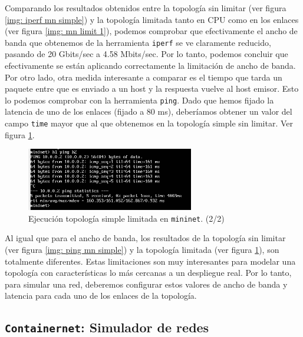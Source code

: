 \documentclass[12pt]{article}
\begin{document}
	\noindent Comparando los resultados obtenidos entre la topología sin limitar (ver figura \ref{img: iperf mn simple}) y la topología limitada tanto en CPU como en los enlaces (ver figura \ref{img: mn limit 1}), podemos comprobar que efectivamente el ancho de banda que obtenemos de la herramienta \texttt{iperf} se ve claramente reducido, pasando de 20 Gbits/sec a 4.58 Mbits/sec. Por lo tanto, podemos concluir que efectivamente se están aplicando correctamente la limitación de ancho de banda. \\
	
	\noindent Por otro lado, otra medida interesante a comparar es el tiempo que tarda un paquete entre que es enviado a un host y la respuesta vuelve al host emisor. Esto lo podemos comprobar con la herramienta \texttt{ping}. Dado que hemos fijado la latencia de uno de los enlaces (fijado a 80 ms), deberíamos obtener un valor del campo \texttt{time} mayor que al que obtenemos en la topología simple sin limitar. Ver figura \ref{img: mn limit 2}.
	
	\begin{figure}[h!]
		\begin{center}
			\includegraphics[width=0.65\textwidth]{img/mn_limit_2.png}
			\caption{Ejecución topología simple limitada en \texttt{mininet}. (2/2)}
			\label{img: mn limit 2}	
		\end{center}
	\end{figure}

	\noindent Al igual que para el ancho de banda, los resultados de la topología sin limitar (ver figura \ref{img: ping mn simple}) y la topología limitada (ver figura \ref{img: mn limit 2}), son totalmente diferentes. Estas limitaciones son muy interesantes para modelar una topología con características lo más cercanas a un despliegue real. Por lo tanto, para simular una red, deberemos configurar estos valores de ancho de banda y latencia para cada uno de los enlaces de la topología.
	
	\pagebreak
	
	\subsection{\texttt{Containernet}: Simulador de redes}
	
\end{document}
